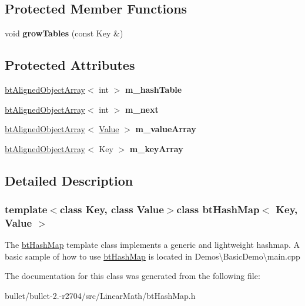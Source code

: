 \subsection*{Protected Member Functions}
\begin{DoxyCompactItemize}
\item 
\hypertarget{classbt_hash_map_a5e5a1d837970bcad57b8c9bd5af043a7}{void {\bfseries grow\+Tables} (const Key \&)}\label{classbt_hash_map_a5e5a1d837970bcad57b8c9bd5af043a7}

\end{DoxyCompactItemize}
\subsection*{Protected Attributes}
\begin{DoxyCompactItemize}
\item 
\hypertarget{classbt_hash_map_aa67a61044c9c6f30ff5a96462ccf5556}{\hyperlink{classbt_aligned_object_array}{bt\+Aligned\+Object\+Array}$<$ int $>$ {\bfseries m\+\_\+hash\+Table}}\label{classbt_hash_map_aa67a61044c9c6f30ff5a96462ccf5556}

\item 
\hypertarget{classbt_hash_map_aa8840bc96694422fc0c87c5765542544}{\hyperlink{classbt_aligned_object_array}{bt\+Aligned\+Object\+Array}$<$ int $>$ {\bfseries m\+\_\+next}}\label{classbt_hash_map_aa8840bc96694422fc0c87c5765542544}

\item 
\hypertarget{classbt_hash_map_ad149907af1dbd16f562b044cafcf0f3d}{\hyperlink{classbt_aligned_object_array}{bt\+Aligned\+Object\+Array}$<$ \hyperlink{union_value}{Value} $>$ {\bfseries m\+\_\+value\+Array}}\label{classbt_hash_map_ad149907af1dbd16f562b044cafcf0f3d}

\item 
\hypertarget{classbt_hash_map_ac8ef0499e06dec182a648ae1c6696b90}{\hyperlink{classbt_aligned_object_array}{bt\+Aligned\+Object\+Array}$<$ Key $>$ {\bfseries m\+\_\+key\+Array}}\label{classbt_hash_map_ac8ef0499e06dec182a648ae1c6696b90}

\end{DoxyCompactItemize}


\subsection{Detailed Description}
\subsubsection*{template$<$class Key, class Value$>$class bt\+Hash\+Map$<$ Key, Value $>$}

The \hyperlink{classbt_hash_map}{bt\+Hash\+Map} template class implements a generic and lightweight hashmap. A basic sample of how to use \hyperlink{classbt_hash_map}{bt\+Hash\+Map} is located in Demos\textbackslash{}\+Basic\+Demo\textbackslash{}main.\+cpp 

The documentation for this class was generated from the following file\+:\begin{DoxyCompactItemize}
\item 
bullet/bullet-\/2.-\/r2704/src/\+Linear\+Math/bt\+Hash\+Map.\+h\end{DoxyCompactItemize}
